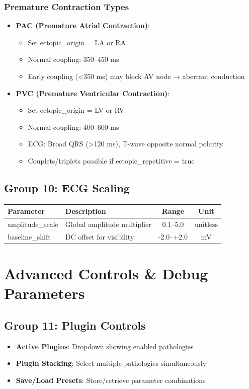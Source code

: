 \documentclass[11pt, a4paper]{article}
\begin{document}
\subsubsection{Premature Contraction Types}
\begin{itemize}
    \item \textbf{PAC (Premature Atrial Contraction)}:
    \begin{itemize}
        \item Set ectopic\_origin = LA or RA
        \item Normal coupling: 350--450 ms
        \item Early coupling (<350 ms) may block AV node → aberrant conduction
    \end{itemize}
    \item \textbf{PVC (Premature Ventricular Contraction)}:
    \begin{itemize}
        \item Set ectopic\_origin = LV or RV
        \item Normal coupling: 400--600 ms
        \item ECG: Broad QRS (>120 ms), T-wave opposite normal polarity
        \item Couplets/triplets possible if ectopic\_repetitive = true
    \end{itemize}
\end{itemize}

\subsection{Group 10: ECG Scaling}

\begin{tabularx}{\textwidth}{|l|X|c|c|}
\hline
\textbf{Parameter} & \textbf{Description} & \textbf{Range} & \textbf{Unit} \\
\hline
amplitude\_scale & Global amplitude multiplier & 0.1--5.0 & unitless \\
baseline\_shift & DC offset for visibility & -2.0--+2.0 & mV \\
\hline
\end{tabularx}

\newpage
\section{Advanced Controls \& Debug Parameters}

\subsection{Group 11: Plugin Controls}
\begin{itemize}
    \item \textbf{Active Plugins}: Dropdown showing enabled pathologies
    \item \textbf{Plugin Stacking}: Select multiple pathologies simultaneously
    \item \textbf{Save/Load Presets}: Store/retrieve parameter combinations
\end{itemize}
\end{document}
